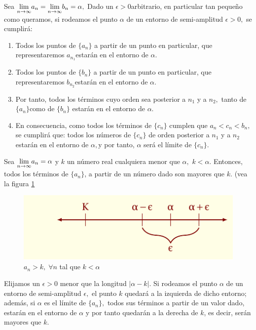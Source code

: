 \documentclass[oneside,english,spanish,2m,twoside,svgnames,x11names,HTML,twoside,12pt]{libro-matua}\usepackage[]{graphicx}\usepackage[]{color}
\newcommand{\val}[1]{\left|#1\right|}
\begin{document}
\begin{dems}

Sea $\Lim{a_{n}}n{\infty}=\Lim{b_{n}}n{\infty}=\alpha,$ Dado un $\epsilon>0$arbitrario,
en particular tan pequeño como queramos, si rodeamos el punto $\alpha$
de un entorno de semi-amplitud $\epsilon>0,$ se cumplirá:
\begin{enumerate}
\item Todos los puntos de $\{a_{n}\}$ a partir de un punto en particular,
que representaremos $a_{n_{1}}$estarán en el entorno de $\alpha.$
\item Todos los puntos de $\{b_{n}\}$ a partir de un punto en particular,
que representaremos $b_{n_{2}}$estarán en el entorno de $\alpha.$
\item Por tanto, todos los términos cuyo orden sea posterior a $n_{1}$
y a $n_{2},$ tanto de $\{a_{n}\}$como de $\{b_{n}\}$ estarán en
el entorno de $\alpha.$
\item En consecuencia, como todos los términos de $\{c_{n}\}$ cumplen que
$a_{n}<c_{n}<b_{n},$ se cumplirá que: todos los números de $\{c_{n}\}$
de orden posterior a $n_{1}$ y a $n_{2}$estarán en el entorno de
$\alpha,$y por tanto, $\alpha$ será el límite de $\{c_{n}\}.$
\end{enumerate}
\end{dems}

\begin{propiedad}{}

Sea $\Lim{a_{n}}n{\infty}=\alpha$ y $k$ un número real cualquiera
menor que $\alpha,$ $k<\alpha.$ Entonces, todos los términos de
$\{a_{n}\}$, a partir de un número dado son mayores que $k.$ (vea
la figura \ref{fig:cal_lim11} 

\end{propiedad}

\begin{figure}[H] \centering

\includegraphics{12_home_antalcides_MEGA_calculo_I_libro_pdf_cal_lim11.pdf}
\caption{$a_n>k,\;\forall n$ tal que $k<\alpha $}
\label{fig:cal_lim11} \end{figure}

\begin{dems}

Elijamos un $\epsilon>0$ menor que la longitud $\val{\alpha-k}.$
Si rodeamos el punto $\alpha$ de un entorno de semi-amplitud $\epsilon,$
el punto $k$ quedará a la izquierda de dicho entorno; además, si
$\alpha$ es el límite de $\{a_{n}\},$ todos sus términos a partir
de un valor dado, estarán en el entorno de $\alpha$ y por tanto quedarán
a la derecha de $k$, es decir, serán mayores que $k.$ 

\end{dems}
\end{document}
